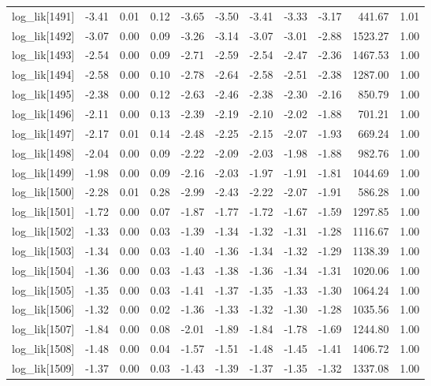 \begin{table}[ht]
\begin{tabular}{rrrrrrrrrrr}
  log\_lik[1491] & -3.41 & 0.01 & 0.12 & -3.65 & -3.50 & -3.41 & -3.33 & -3.17 & 441.67 & 1.01 \\ 
  log\_lik[1492] & -3.07 & 0.00 & 0.09 & -3.26 & -3.14 & -3.07 & -3.01 & -2.88 & 1523.27 & 1.00 \\ 
  log\_lik[1493] & -2.54 & 0.00 & 0.09 & -2.71 & -2.59 & -2.54 & -2.47 & -2.36 & 1467.53 & 1.00 \\ 
  log\_lik[1494] & -2.58 & 0.00 & 0.10 & -2.78 & -2.64 & -2.58 & -2.51 & -2.38 & 1287.00 & 1.00 \\ 
  log\_lik[1495] & -2.38 & 0.00 & 0.12 & -2.63 & -2.46 & -2.38 & -2.30 & -2.16 & 850.79 & 1.00 \\ 
  log\_lik[1496] & -2.11 & 0.00 & 0.13 & -2.39 & -2.19 & -2.10 & -2.02 & -1.88 & 701.21 & 1.00 \\ 
  log\_lik[1497] & -2.17 & 0.01 & 0.14 & -2.48 & -2.25 & -2.15 & -2.07 & -1.93 & 669.24 & 1.00 \\ 
  log\_lik[1498] & -2.04 & 0.00 & 0.09 & -2.22 & -2.09 & -2.03 & -1.98 & -1.88 & 982.76 & 1.00 \\ 
  log\_lik[1499] & -1.98 & 0.00 & 0.09 & -2.16 & -2.03 & -1.97 & -1.91 & -1.81 & 1044.69 & 1.00 \\ 
  log\_lik[1500] & -2.28 & 0.01 & 0.28 & -2.99 & -2.43 & -2.22 & -2.07 & -1.91 & 586.28 & 1.00 \\ 
  log\_lik[1501] & -1.72 & 0.00 & 0.07 & -1.87 & -1.77 & -1.72 & -1.67 & -1.59 & 1297.85 & 1.00 \\ 
  log\_lik[1502] & -1.33 & 0.00 & 0.03 & -1.39 & -1.34 & -1.32 & -1.31 & -1.28 & 1116.67 & 1.00 \\ 
  log\_lik[1503] & -1.34 & 0.00 & 0.03 & -1.40 & -1.36 & -1.34 & -1.32 & -1.29 & 1138.39 & 1.00 \\ 
  log\_lik[1504] & -1.36 & 0.00 & 0.03 & -1.43 & -1.38 & -1.36 & -1.34 & -1.31 & 1020.06 & 1.00 \\ 
  log\_lik[1505] & -1.35 & 0.00 & 0.03 & -1.41 & -1.37 & -1.35 & -1.33 & -1.30 & 1064.24 & 1.00 \\ 
  log\_lik[1506] & -1.32 & 0.00 & 0.02 & -1.36 & -1.33 & -1.32 & -1.30 & -1.28 & 1035.56 & 1.00 \\ 
  log\_lik[1507] & -1.84 & 0.00 & 0.08 & -2.01 & -1.89 & -1.84 & -1.78 & -1.69 & 1244.80 & 1.00 \\ 
  log\_lik[1508] & -1.48 & 0.00 & 0.04 & -1.57 & -1.51 & -1.48 & -1.45 & -1.41 & 1406.72 & 1.00 \\ 
  log\_lik[1509] & -1.37 & 0.00 & 0.03 & -1.43 & -1.39 & -1.37 & -1.35 & -1.32 & 1337.08 & 1.00 \\ 

\end{tabular}
\end{table}

